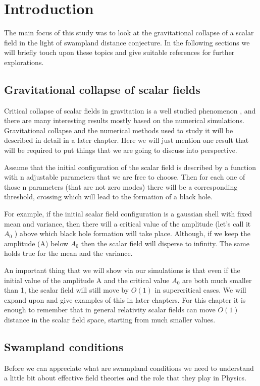 \chapter{Introduction}

The main focus of this study was to look at the gravitational collapse of a scalar field in the light of swampland distance conjecture. In the following sections we will briefly touch upon these topics and give suitable references for further explorations.

\section{Gravitational collapse of scalar fields}


Critical collapse of scalar fields in gravitation is a well studied phenomenon \citep{Gundlach:2007gc}, and there are many interesting results mostly based on the numerical simulations. Gravitational collapse and the numerical methods used to study it will be described in detail in a later chapter. Here we will just mention one result that will be required to put things that we are going to discuss into perspective.

Assume that the initial configuration of the scalar field is described by a function with n adjustable parameters that we are free to choose. Then for each one of those n parameters (that are not zero modes) there will be a corresponding threshold, crossing which will lead to the formation of a black hole.

For example, if the initial scalar field configuration is a gaussian shell with fixed mean and variance, then there will a critical value of the amplitude (let’s call it $A_0$ ) above which black hole formation will take place. Although, if we keep the amplitude (A) below $A_0$ then the scalar field will disperse to infinity. The same holds true for the mean and the variance.

An important thing that we will show via our simulations is that even if the initial value of the amplitude A and the critical value $A_0$ are both much smaller than 1, the scalar field will still move by $O(1)$ in supercritical cases. We will expand upon and give examples of this in later chapters.
For this chapter it is enough to remember that in general relativity scalar fields can move $O(1)$ distance in the scalar field space, starting from much smaller values.

\section{Swampland conditions}
Before we can appreciate what are swampland conditions we need to understand a little bit about effective field theories and the role that they play in Physics.

